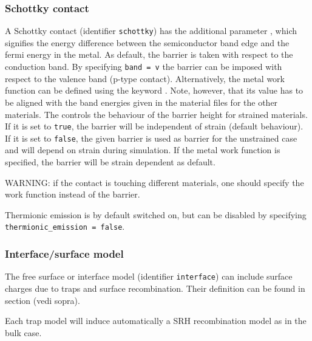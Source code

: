 \subsubsection{Schottky contact}
A Schottky contact  (identifier \texttt{schottky}) has the additional parameter , which signifies the energy difference between the semiconductor band edge and the fermi energy in the metal.
As default, the barrier is taken with respect to the conduction band.
By specifying \verb+band = v+ the barrier can be imposed with respect to the valence band (p-type contact).
Alternatively, the metal work function can be defined using the keyword . Note, however, that its value has to be aligned with the band energies given in the material files for the other materials.
The  controls the behaviour of the barrier height for  strained materials.
If it is set to \texttt{true}, the barrier will be independent of strain (default behaviour).
If it is set to \texttt{false}, the given barrier is used as barrier for the unstrained case and  will depend on strain during simulation.
If the metal work function is specified, the barrier will be strain dependent as default.

WARNING: if the contact is touching different materials, one should specify the work function instead of the barrier.


Thermionic emission is by default switched on, but can be disabled by specifying \texttt{thermionic\_emission = false}.


\subsubsection{Interface/surface model}
The free surface or interface model (identifier \texttt{interface}) can include surface charges due to traps and surface recombination.
Their definition can be found in section (vedi sopra).

Each trap model will induce automatically a SRH recombination model as in the bulk case.






